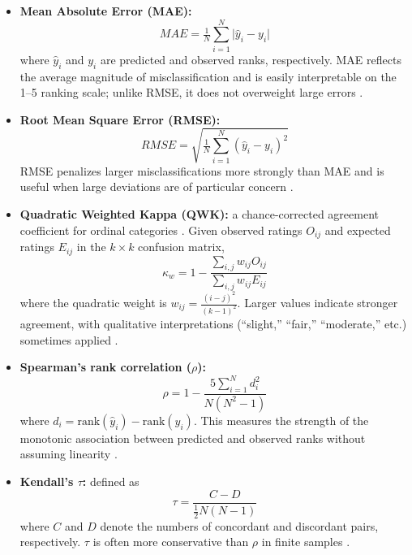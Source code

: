 \begin{itemize}
  \item \textbf{Mean Absolute Error (MAE):}  
  \begin{equation}
    MAE = \tfrac{1}{N}\sum_{i=1}^{N} \lvert \hat{y}_i - y_i \rvert
  \end{equation}
  where $\hat{y}_i$ and $y_i$ are predicted and observed ranks, respectively.
  MAE reflects the average magnitude of misclassification and is easily
  interpretable on the 1–5 ranking scale; unlike RMSE, it does not overweight
  large errors \citep{Willmott2005,Chai2014}.
  
  \item \textbf{Root Mean Square Error (RMSE):}  
  \begin{equation}
  RMSE = \sqrt{\tfrac{1}{N}\sum_{i=1}^{N} \left(\hat{y}_i - y_i\right)^2}
  \end{equation}
  RMSE penalizes larger misclassifications more strongly than MAE and is useful
  when large deviations are of particular concern \citep{Chai2014,Willmott2005}.
  
  \item \textbf{Quadratic Weighted Kappa (QWK):} a chance-corrected agreement
  coefficient for ordinal categories \citep{Cohen1968}. Given observed ratings
  $O_{ij}$ and expected ratings $E_{ij}$ in the $k \times k$ confusion matrix,
  \begin{equation}
    \kappa_w = 1 - \frac{\sum_{i,j} w_{ij} O_{ij}}{\sum_{i,j} w_{ij} E_{ij}}
  \end{equation}
  where the quadratic weight is 
  $w_{ij} = \tfrac{(i-j)^2}{(k-1)^2}$. Larger values indicate stronger
  agreement, with qualitative interpretations (``slight,'' ``fair,''
  ``moderate,'' etc.) sometimes applied \citep{Landis1977}.
  
  \item \textbf{Spearman’s rank correlation ($\rho$):}  
  \begin{equation}
    \rho = 1 - \frac{5\sum_{i=1}^{N} d_i^2}{N(N^2-1)}
  \end{equation}
  where $d_i = \text{rank}(\hat{y}_i) - \text{rank}(y_i)$. This measures the
  strength of the monotonic association between predicted and observed ranks
  without assuming linearity \citep{Spearman1904}.
  
  \item \textbf{Kendall’s $\tau$:} defined as
  \begin{equation}
    \tau = \frac{C - D}{\tfrac{1}{2}N(N-1)}
  \end{equation}
  where $C$ and $D$ denote the numbers of concordant and discordant pairs,
  respectively. $\tau$ is often more conservative than $\rho$ in finite samples
  \citep{kendall_new_1938}.
\end{itemize}

